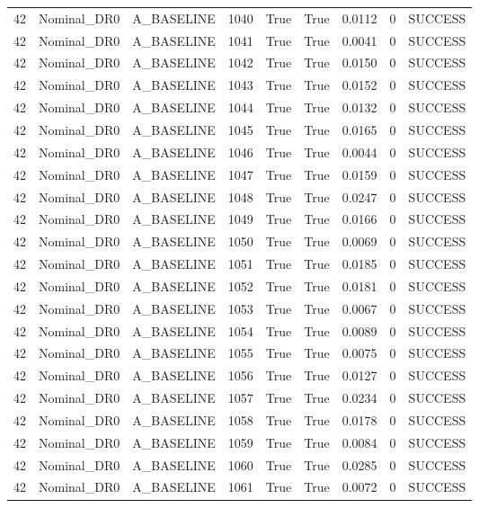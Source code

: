 \documentclass[11pt,a4paper,oneside]{book}
\begin{document}
\begin{longtable}{l l l l l l l l l}
42 & Nominal\_DR0 & A\_BASELINE & 1040 & True & True & 0.0112 & 0 & SUCCESS \\
42 & Nominal\_DR0 & A\_BASELINE & 1041 & True & True & 0.0041 & 0 & SUCCESS \\
42 & Nominal\_DR0 & A\_BASELINE & 1042 & True & True & 0.0150 & 0 & SUCCESS \\
42 & Nominal\_DR0 & A\_BASELINE & 1043 & True & True & 0.0152 & 0 & SUCCESS \\
42 & Nominal\_DR0 & A\_BASELINE & 1044 & True & True & 0.0132 & 0 & SUCCESS \\
42 & Nominal\_DR0 & A\_BASELINE & 1045 & True & True & 0.0165 & 0 & SUCCESS \\
42 & Nominal\_DR0 & A\_BASELINE & 1046 & True & True & 0.0044 & 0 & SUCCESS \\
42 & Nominal\_DR0 & A\_BASELINE & 1047 & True & True & 0.0159 & 0 & SUCCESS \\
42 & Nominal\_DR0 & A\_BASELINE & 1048 & True & True & 0.0247 & 0 & SUCCESS \\
42 & Nominal\_DR0 & A\_BASELINE & 1049 & True & True & 0.0166 & 0 & SUCCESS \\
42 & Nominal\_DR0 & A\_BASELINE & 1050 & True & True & 0.0069 & 0 & SUCCESS \\
42 & Nominal\_DR0 & A\_BASELINE & 1051 & True & True & 0.0185 & 0 & SUCCESS \\
42 & Nominal\_DR0 & A\_BASELINE & 1052 & True & True & 0.0181 & 0 & SUCCESS \\
42 & Nominal\_DR0 & A\_BASELINE & 1053 & True & True & 0.0067 & 0 & SUCCESS \\
42 & Nominal\_DR0 & A\_BASELINE & 1054 & True & True & 0.0089 & 0 & SUCCESS \\
42 & Nominal\_DR0 & A\_BASELINE & 1055 & True & True & 0.0075 & 0 & SUCCESS \\
42 & Nominal\_DR0 & A\_BASELINE & 1056 & True & True & 0.0127 & 0 & SUCCESS \\
42 & Nominal\_DR0 & A\_BASELINE & 1057 & True & True & 0.0234 & 0 & SUCCESS \\
42 & Nominal\_DR0 & A\_BASELINE & 1058 & True & True & 0.0178 & 0 & SUCCESS \\
42 & Nominal\_DR0 & A\_BASELINE & 1059 & True & True & 0.0084 & 0 & SUCCESS \\
42 & Nominal\_DR0 & A\_BASELINE & 1060 & True & True & 0.0285 & 0 & SUCCESS \\
42 & Nominal\_DR0 & A\_BASELINE & 1061 & True & True & 0.0072 & 0 & SUCCESS \\

\end{longtable}
\end{document}
